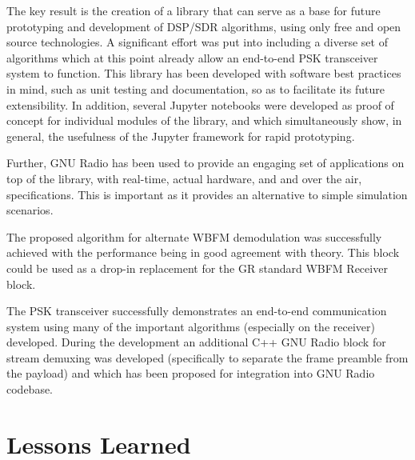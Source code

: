 The key result is the creation of a library that can serve as a base for future prototyping and development of DSP/SDR algorithms, using only free and open source technologies. A significant effort was put into including a diverse set of algorithms which at this point already allow an end-to-end PSK transceiver system to function. This library has been developed with software best practices in mind, such as unit testing and documentation, so as to facilitate its future extensibility. In addition, several Jupyter notebooks were developed as proof of concept for individual modules of the library, and which simultaneously show, in general, the usefulness of the Jupyter framework for rapid prototyping.

Further, GNU Radio has been used to provide an engaging set of applications on top of the library, with real-time, actual hardware, and and over the air, specifications. This is important as it provides an alternative to simple simulation scenarios.

The proposed algorithm for alternate WBFM demodulation was successfully achieved with the performance being in good agreement with theory. This block could be used as a drop-in replacement for the GR standard WBFM Receiver block.

The PSK transceiver successfully demonstrates an end-to-end communication system using many of the important algorithms (especially on the receiver) developed. During the development an additional C++ GNU Radio block for stream demuxing was developed (specifically to separate the frame preamble from the payload) and which has been proposed for integration into GNU Radio codebase.

\section{Lessons Learned}
\label{sect:lessons_learnt}

